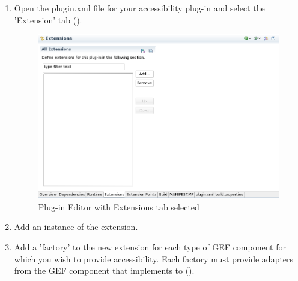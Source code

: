 \begin{enumerate}
\item  Open the plugin.xml file for your accessibility plug-in and select the 'Extension' tab ().

\begin{figure}[h]
\begin{center}
\includegraphics[width=12.5cm]{Tasks/GEF/PS/extensionstab}
\caption{Plug-in Editor with Extensions tab selected}
\label{extensionstab}
\end{center}
\end{figure}

\item Add an instance of the  extension. 
\item Add a 'factory' to the new extension for each type of GEF component for which you wish to provide accessibility. Each factory must provide adapters from the GEF component that implements  to  ().


\end{enumerate}
